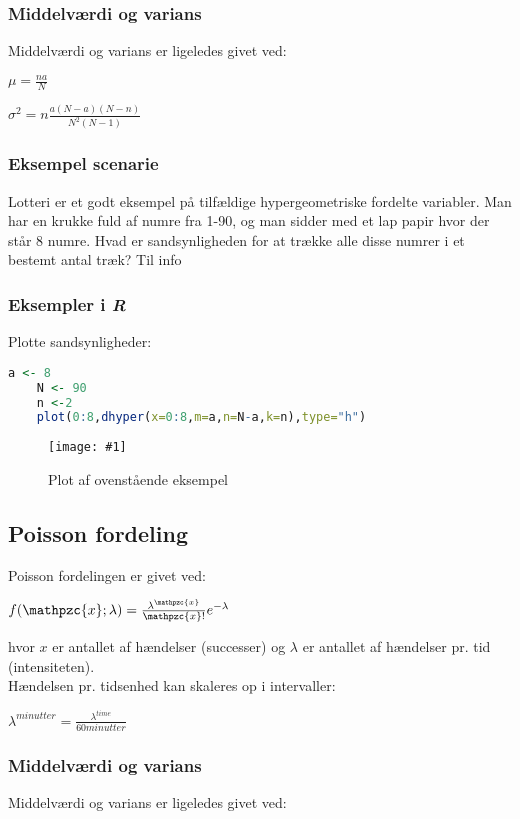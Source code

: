 \documentclass{article}
\newcommand{\mellemrum}{\vspace{2 ex}}
\newcommand{\pic}[3]{\begin{figure}[H]
		\centering
		\texttt{[image: \#1]}
		
		\caption{#2}
\end{figure}}
\newcommand{\cent}[1]{ \mellemrum \begin{center} #1\end{center} \mellemrum }
\newcommand{\script}[1]{\mathpzc{#1}}
\begin{document}
	
	
	\subsubsection{Middelværdi og varians}
	
	Middelværdi og varians er ligeledes givet ved:
	
	\cent{$ \mu = \frac{na}{N} $}
	\cent{$ \sigma^2 = n \frac{a(N-a)(N-n)}{N^2(N-1)} $}
	
	\subsubsection{Eksempel scenarie}
	
	Lotteri er et godt eksempel på tilfældige hypergeometriske fordelte variabler. Man har en krukke fuld af numre fra 1-90, og man sidder med et lap papir hvor der står 8 numre. Hvad er sandsynligheden for at trække alle disse numrer i et bestemt antal træk? Til info
	
	\subsubsection{Eksempler i \textit{R}}
	
	Plotte sandsynligheder:
	
	\begin{lstlisting}[language=R]
	a <- 8
	N <- 90
	n <-2
	plot(0:8,dhyper(x=0:8,m=a,n=N-a,k=n),type="h")	\end{lstlisting}
	
	\pic{HyperPlot.jpg}{Plot af ovenstående eksempel}{200px}
	
	\subsection{Poisson fordeling}
	
	Poisson fordelingen er givet ved:
	
	\cent{$ f(\script{x};\lambda)= \frac{\lambda^{\script{x}}}{\script{x}!} e^{-\lambda} $}
	
	hvor $x$ er antallet af hændelser (successer) og $\lambda$ er antallet af hændelser pr. tid (intensiteten).\\
	
	Hændelsen pr. tidsenhed kan skaleres op i intervaller:
	
	\cent{$ \lambda^{minutter} = \frac{\lambda^{time}}{60 minutter}  $}
	
	\subsubsection{Middelværdi og varians}	
	Middelværdi og varians er ligeledes givet ved:
	
\end{document}
